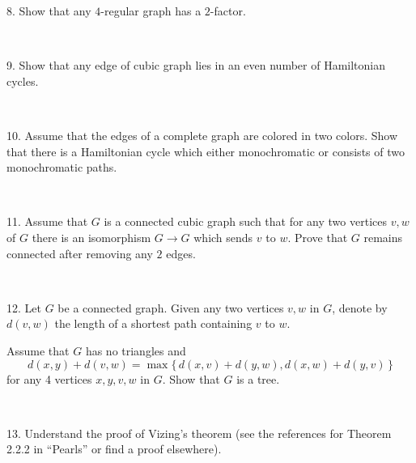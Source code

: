 \documentclass[oneside,a4paper]{article}
\begin{document}
\noindent 
{8.} %
Show that any $4$-regular graph has a $2$-factor.

\ 

\noindent %
{9.} %
Show that any edge of cubic graph lies in an even number of Hamiltonian cycles.


\ 

\noindent 
{10.}
Assume that the edges of a complete graph are colored in two colors.
Show that there is a Hamiltonian cycle which either monochromatic or consists of two monochromatic paths.

\ 

\noindent %
{11.}  %
Assume that $G$ is a connected cubic graph such that 
for any two vertices $v,w$ of $G$ there is an isomorphism
$G\to G$ which sends $v$ to $w$.
Prove that $G$ remains connected after removing any $2$ edges.

\ 


\noindent %
{12.} %
Let $G$ be a connected graph.
Given any two vertices $v,w$ in $G$, denote by $d(v,w)$ the length of a shortest path containing $v$ to $w$. 

Assume that $G$ has no triangles and
\[d(x,y)+d(v,w)=\max\{\,d(x,v)+d(y,w),d(x,w)+d(y,v)\,\}\]
for any 4 vertices $x,y,v,w$ in $G$.
Show that $G$ is a tree.

\ 

\noindent %
{13.} %
Understand the proof of Vizing's theorem (see the references for Theorem 2.2.2 in ``Pearls'' or find a proof elsewhere).
\end{document}
